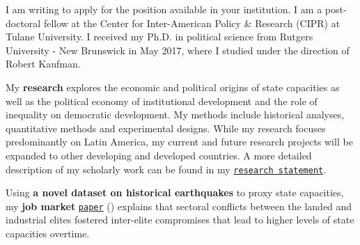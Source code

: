 \vspace{-0.3cm}I am writing to apply for the position available in your institution. I am a post-doctoral fellow at the Center for Inter-American Policy \& Research (CIPR) at Tulane University. I received my Ph.D. in political science from Rutgers University - New Brunswick in May 2017, where I studied under the direction of Robert Kaufman.

My {\bf research} explores the economic and political origins of state capacities as well as the political economy of institutional development and the role of inequality on democratic development. My methods include historical analyses, quantitative methods and experimental designs. While my research focuses predominantly on Latin America, my current and future research projects will be expanded to other developing and developed countries. A more detailed description of my scholarly work can be found in my \href{http://github.com/hbahamonde/Job_Market/raw/master/Bahamonde_Research_Statement.pdf}{\texttt{research statement}}.


Using {\bf a novel dataset on historical earthquakes} to proxy state capacities, my {\bf job market} \href{https://github.com/hbahamonde/Earthquake_Paper/raw/master/Bahamonde_Earthquake_Paper.pdf}{\texttt{paper}} (\emph{\unskip}) explains that sectoral conflicts between the landed and industrial elites fostered inter-elite compromises that lead to higher levels of state capacities overtime. 

